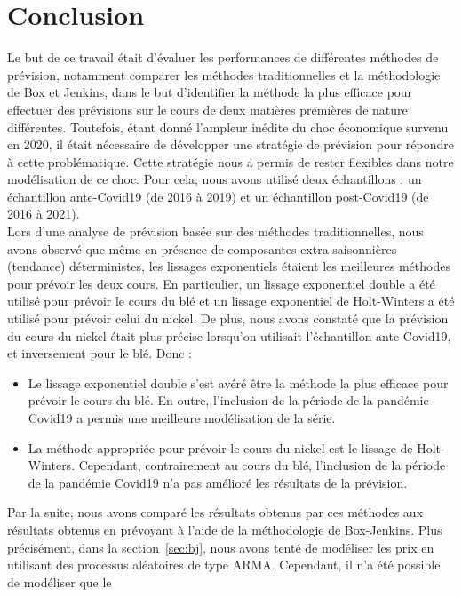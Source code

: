 \section*{Conclusion}
Le but de ce travail était d'évaluer les performances de différentes méthodes de prévision, notamment comparer les méthodes traditionnelles et la méthodologie de Box et 
Jenkins, dans le but d'identifier la méthode la plus efficace pour effectuer des prévisions sur le cours de deux matières premières de nature différentes. Toutefois, étant 
donné l'ampleur inédite du choc économique survenu en 2020, il était nécessaire de développer une stratégie de prévision pour répondre à cette problématique. Cette 
stratégie nous a permis de rester flexibles dans notre modélisation de ce choc. Pour cela, nous avons utilisé deux échantillons : un échantillon ante-Covid19 (de 2016 à 
2019) et un échantillon post-Covid19 (de 2016 à 2021).\\[11pt]
Lors d'une analyse de prévision basée sur des méthodes traditionnelles, nous avons observé que même en présence de composantes extra-saisonnières (tendance) déterministes, 
les lissages exponentiels étaient les meilleures méthodes pour prévoir les deux cours. En particulier, un lissage exponentiel double a été utilisé pour prévoir le cours du 
blé et un lissage exponentiel de Holt-Winters a été utilisé pour prévoir celui du nickel. De plus, nous avons constaté que la prévision du cours du nickel était plus 
précise lorsqu'on utilisait l'échantillon ante-Covid19, et inversement pour le blé. Donc :
\begin{itemize}
    \item Le lissage exponentiel double s'est avéré être la méthode la plus efficace pour prévoir le cours du blé. En outre, l'inclusion de la période de la pandémie 
    Covid19 a permis une meilleure modélisation de la série.
    \item La méthode appropriée pour prévoir le cours du nickel est le lissage de Holt-Winters. Cependant, contrairement au cours du blé, l'inclusion de la période de la 
    pandémie Covid19 n'a pas amélioré les résultats de la prévision.
\end{itemize}
Par la suite, nous avons comparé les résultats obtenus par ces méthodes aux résultats obtenus en prévoyant à l'aide de la méthodologie de Box-Jenkins. Plus précisément, 
dans la section~\ref{sec:bj}, nous avons tenté de modéliser les prix en utilisant des processus aléatoires de type ARMA. Cependant, il n'a été possible de modéliser que le 
